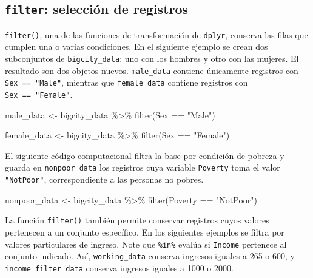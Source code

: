 \documentclass[
  spanish,
  11pt,
  letterpaper,
  oneside,
  open=any]{scrbook}
\newenvironment{Shaded}{\begin{snugshade}}{\end{snugshade}}
\newcommand{\FunctionTok}[1]{\textcolor[rgb]{0.28,0.35,0.67}{#1}}
\newcommand{\NormalTok}[1]{\textcolor[rgb]{0.00,0.23,0.31}{#1}}
\newcommand{\OtherTok}[1]{\textcolor[rgb]{0.00,0.23,0.31}{#1}}
\newcommand{\SpecialCharTok}[1]{\textcolor[rgb]{0.37,0.37,0.37}{#1}}
\newcommand{\StringTok}[1]{\textcolor[rgb]{0.13,0.47,0.30}{#1}}
\begin{document}
\subsection{\texorpdfstring{\texttt{filter}: selección de
registros}{filter: selección de registros}}\label{filter-seleccion-de-registros}

\texttt{filter()}, una de las funciones de transformación de
\texttt{dplyr}, conserva las filas que cumplen una o varias condiciones.
En el siguiente ejemplo se crean dos subconjuntos de
\texttt{bigcity\_data}: uno con los hombres y otro con las mujeres. El
resultado son dos objetos nuevos. \texttt{male\_data} contiene
únicamente registros con \texttt{Sex\ ==\ "Male"}, mientras que
\texttt{female\_data} contiene registros con \texttt{Sex\ ==\ "Female"}.

\begin{Shaded}
\begin{Highlighting}[]
\NormalTok{male\_data }\OtherTok{\textless{}{-}}\NormalTok{ bigcity\_data }\SpecialCharTok{\%\textgreater{}\%}
  \FunctionTok{filter}\NormalTok{(Sex }\SpecialCharTok{==} \StringTok{"Male"}\NormalTok{)}

\NormalTok{female\_data }\OtherTok{\textless{}{-}}\NormalTok{ bigcity\_data }\SpecialCharTok{\%\textgreater{}\%}
  \FunctionTok{filter}\NormalTok{(Sex }\SpecialCharTok{==} \StringTok{"Female"}\NormalTok{)}
\end{Highlighting}
\end{Shaded}

El siguiente código computacional filtra la base por condición de
pobreza y guarda en \texttt{nonpoor\_data} los registros cuya variable
\texttt{Poverty} toma el valor \texttt{"NotPoor"}, correspondiente a las
personas no pobres.

\begin{Shaded}
\begin{Highlighting}[]
\NormalTok{nonpoor\_data }\OtherTok{\textless{}{-}}\NormalTok{ bigcity\_data }\SpecialCharTok{\%\textgreater{}\%}
  \FunctionTok{filter}\NormalTok{(Poverty }\SpecialCharTok{==} \StringTok{"NotPoor"}\NormalTok{)}
\end{Highlighting}
\end{Shaded}

La función \texttt{filter()} también permite conservar registros cuyos
valores pertenecen a un conjunto específico. En los siguientes ejemplos
se filtra por valores particulares de ingreso. Note que \texttt{\%in\%}
evalúa si \texttt{Income} pertenece al conjunto indicado. Así,
\texttt{working\_data} conserva ingresos iguales a 265 o 600, y
\texttt{income\_filter\_data} conserva ingresos iguales a 1000 o 2000.
\end{document}
